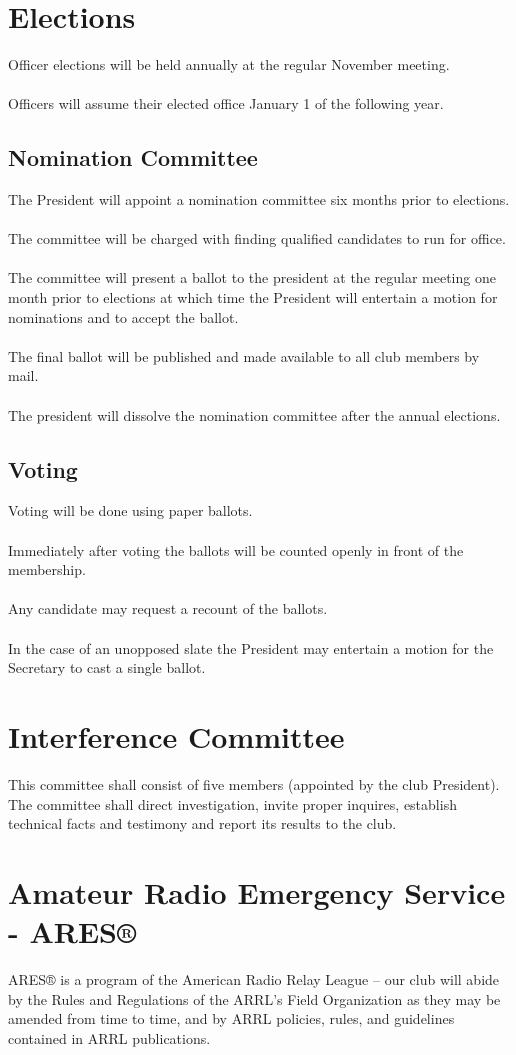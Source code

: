\documentclass[english,12pt,letterpaper]{article}
\begin{document}
	\section{Elections}
	Officer elections will be held annually at the regular November meeting. \\
	\\
	Officers will assume their elected office January 1 of the following year.
	\subsection{Nomination Committee}
	The President will appoint a nomination committee six months prior to elections. \\
	\\
	The committee will be charged with finding qualified candidates to run for office. \\
	\\
	The committee will present a ballot to the president at the regular meeting one month prior to elections at which time the President will entertain a motion for nominations and to accept the ballot. \\
	\\
	The final ballot will be published and made available to all club members by mail. \\
	\\
	The president will dissolve the nomination committee after the annual elections.
	\subsection{Voting}
	Voting will be done using paper ballots. \\
	\\
	Immediately after voting the ballots will be counted openly in front of the membership.\\
	\\
	Any candidate may request a recount of the ballots. \\
	\\
	In the case of an unopposed slate the President may entertain a motion for the Secretary to cast a single ballot. \\
	\section{Interference Committee}
	This committee shall consist of five members (appointed by the club President). The committee shall direct investigation, invite proper inquires, establish technical facts and testimony and report its results to the club.
	\section{Amateur Radio Emergency Service - ARES®}
	ARES® is a program of the American Radio Relay League -- our club will abide by the Rules and Regulations of the ARRL’s Field Organization as they may be amended from time to time, and by ARRL policies, rules, and guidelines contained in ARRL publications.
\end{document}
